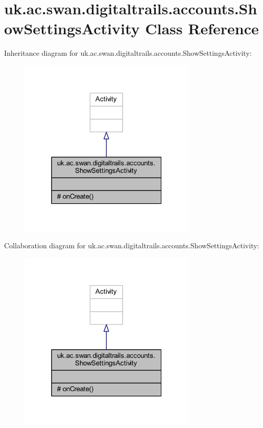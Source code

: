 \hypertarget{classuk_1_1ac_1_1swan_1_1digitaltrails_1_1accounts_1_1_show_settings_activity}{\section{uk.\+ac.\+swan.\+digitaltrails.\+accounts.\+Show\+Settings\+Activity Class Reference}
\label{classuk_1_1ac_1_1swan_1_1digitaltrails_1_1accounts_1_1_show_settings_activity}
}


Inheritance diagram for uk.\+ac.\+swan.\+digitaltrails.\+accounts.\+Show\+Settings\+Activity\+:
\nopagebreak
\begin{figure}[H]
\begin{center}
\leavevmode
\includegraphics[width=241pt]{classuk_1_1ac_1_1swan_1_1digitaltrails_1_1accounts_1_1_show_settings_activity__inherit__graph}
\end{center}
\end{figure}


Collaboration diagram for uk.\+ac.\+swan.\+digitaltrails.\+accounts.\+Show\+Settings\+Activity\+:
\nopagebreak
\begin{figure}[H]
\begin{center}
\leavevmode
\includegraphics[width=241pt]{classuk_1_1ac_1_1swan_1_1digitaltrails_1_1accounts_1_1_show_settings_activity__coll__graph}
\end{center}
\end{figure}
